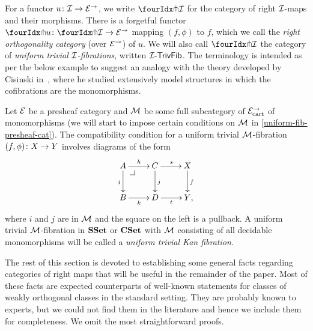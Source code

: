 \documentclass[reqno,10pt,a4paper,oneside,draft]{amsart}
\begin{document}
For a functor $u \co \cal{I} \to \catE^\to$, we write $\liftr{\cal{I}}$ for the category of right $\cal{I}$-maps and their morphisms.
There is a forgetful functor~$\liftr{u} \co \liftr{\cal{I}} \to \catE^\to$ mapping $(f, \phi)$ to $f$, which we call the \emph{right orthogonality category} (over $\catE^\to$) of $u$.
We will also call $\liftr{\cal{I}}$ the category of \emph{uniform trivial $\cal{I}$-fibrations}, written $\TrivFib{\cal{I}}$.
The terminology is intended as per the below example to suggest an analogy with the theory developed by Cisinski in~\cite{cisinski-asterisque}, where he studied extensively model structures in which the cofibrations are the monomorphisms.

\begin{example} \label{exa-triv-kan-fib}
Let $\catE$ be a presheaf category and $\cal{M}$ be some full subcategory of $\catE_\cart^\to$ of monomorphisms (we will start to impose certain conditions on $\cal{M}$ in \cref{uniform-fib-presheaf-cat}).
The compatibility condition for a uniform trivial $\cal{M}$-fibration $(f, \phi) \co X \to Y$ involves diagrams of the form
\[
\xymatrix{
  A
  \ar[r]^{h}
  \ar[d]_{i}
  \pullback{dr}
&
  C \ar[d]^{j}
  \ar[r]^{s}
&
  X \ar[d]^f
\\
  B
  \ar[r]_{k}
&
  D \ar[r]_{t}
&
  Y
\rlap{,}}
\]
where $i$ and $j$ are in $\cal{M}$ and the square on the left is a pullback.
A uniform trivial $\cal{M}$-fibration in $\SSet$ or $\CSet$ with $\cal{M}$ consisting of all decidable monomorphisms will be called a \emph{uniform trivial Kan fibration}.
\end{example}


The rest of this section is devoted to establishing some general facts regarding categories of right maps that will be useful in the remainder of the paper.
Most of these facts are expected counterparts of well-known statements for classes of weakly orthogonal classes in the standard setting.
They are probably known to experts, but we could not find them in the literature and hence we include them for completeness.
We omit the most straightforward proofs.
\end{document}
